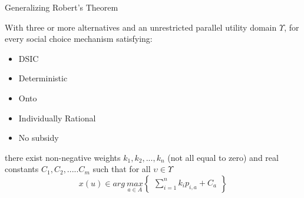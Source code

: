 \begin{frame}{Generalizing Robert's Theorem}
\begin{theorem}
With three or more alternatives and an unrestricted parallel utility domain $\Upsilon$, for every social choice mechanism satisfying:
\begin{itemize}
    \item DSIC
    \item Deterministic
    \item Onto
    \item Individually Rational
    \item No subsidy
\end{itemize}
there exist non-negative weights $k_{1},k_{2},...,k_{n}$ (not all equal to zero) and real constants $C_{1},C_{2},.....C_{m}$ such that for all $\upsilon \in \Upsilon$
$$x(u) \in arg\: \underset{a \in A}{max}\begin{Bmatrix}
\sum _{i=1}^{n}k_{i}p_{i,a} + C_{a}
\end{Bmatrix}$$
\end{theorem}

\end{frame}
